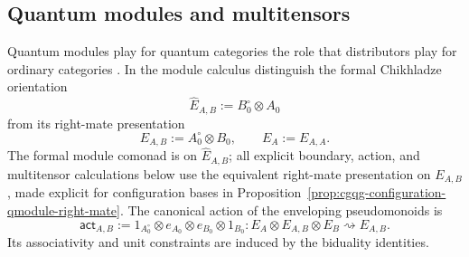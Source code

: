 \documentclass[oneside]{article}
\newcommand{\act}{\mathsf{act}}
\theoremstyle{plain}
\theoremstyle{definition}
\theoremstyle{remark}
\begin{document}
\subsection{Quantum modules and multitensors}

Quantum modules play for quantum categories the role that distributors play for
ordinary categories \cite{Chikhladze2010QuantumModules}. In the module calculus
distinguish the formal Chikhladze orientation
\[
 \widehat E_{A,B}:=B_0^\circ\otimes A_0
\]
from its right-mate presentation
\[
 E_{A,B}:=A_0^\circ\otimes B_0,\qquad E_A:=E_{A,A}.
\]
The formal module comonad is on \(\widehat E_{A,B}\); all explicit boundary,
action, and multitensor calculations below use the equivalent right-mate
presentation on \(E_{A,B}\), made explicit for configuration bases in
Proposition~\ref{prop:cgqg-configuration-qmodule-right-mate}.
The canonical action of the enveloping pseudomonoids is
\begin{equation}
 \act_{A,B}:=
 1_{A_0^\circ}\otimes e_{A_0}\otimes e_{B_0}\otimes1_{B_0}:
 E_A\otimes E_{A,B}\otimes E_B\rightsquigarrow E_{A,B}.
 \label{eq:cgqg-background-canonical-module-action}
\end{equation}
Its associativity and unit constraints are induced by the biduality identities.
\end{document}
